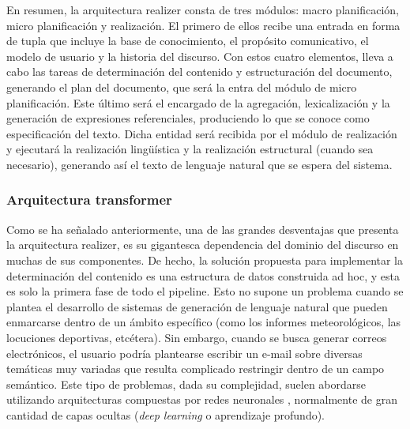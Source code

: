 En resumen, la arquitectura realizer consta de tres módulos: macro planificación, micro planificación y realización. El primero de ellos recibe una entrada en forma de tupla que incluye la base de conocimiento, el propósito comunicativo, el modelo de usuario y la historia del discurso. Con estos cuatro elementos, lleva a cabo las tareas de determinación del contenido y estructuración del documento, generando el plan del documento, que será la entra del módulo de micro planificación. Este último será el encargado de la agregación, lexicalización y la generación de expresiones referenciales, produciendo lo que se conoce como especificación del texto. Dicha entidad será recibida por el módulo de realización y ejecutará la realización lingüística y la realización estructural (cuando sea necesario), generando así el texto de lenguaje natural que se espera del sistema.

\subsubsection{Arquitectura transformer}\label{sss:transformer}
Como se ha señalado anteriormente, una de las grandes desventajas que presenta la arquitectura realizer, es su gigantesca dependencia del dominio del discurso en muchas de sus componentes. De hecho, la solución propuesta para implementar la determinación del contenido es una estructura de datos construida ad hoc, y esta es solo la primera fase de todo el pipeline. Esto no supone un problema cuando se plantea el desarrollo de sistemas de generación de lenguaje natural que pueden enmarcarse dentro de un ámbito específico (como los informes meteorológicos, las locuciones deportivas, etcétera). Sin embargo, cuando se busca generar correos electrónicos, el usuario podría plantearse escribir un e-mail sobre diversas temáticas muy variadas que resulta complicado restringir dentro de un campo semántico. Este tipo de problemas, dada su complejidad, suelen abordarse utilizando arquitecturas compuestas por redes neuronales \citep{goldberg2016primer}, normalmente de gran cantidad de capas ocultas (\textit{deep learning} o aprendizaje profundo).

